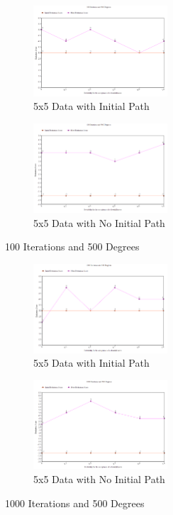 \documentclass[11pt, oneside]{article}   	%
\begin{document}
\begin{figure}[H]
\centering
\begin{subfigure}{.5\textwidth}
	\centering
	\includegraphics[width=50mm]{5x5lowIhighT.png}
	\caption{5x5 Data with Initial Path}
	\label{fig:method}
\end{subfigure}%
\begin{subfigure}{.5\textwidth}
	\centering
	\includegraphics[width=50mm]{5x5lowIhighTPath.png}
	\caption{5x5 Data with No Initial Path}
	\label{fig:method}
\end{subfigure}
\caption{100 Iterations and 500 Degrees}
\end{figure}

\begin{figure}[H]
\centering
\begin{subfigure}{.5\textwidth}
	\centering
	\includegraphics[width=50mm]{5x5highIhighT.png}
	\caption{5x5 Data with Initial Path}
	\label{fig:method}
\end{subfigure}%
\begin{subfigure}{.5\textwidth}
	\centering
	\includegraphics[width=50mm]{5x5highIhighTPath.png}
	\caption{5x5 Data with No Initial Path}
	\label{fig:method}
\end{subfigure}
\caption{1000 Iterations and 500 Degrees}
\end{figure}
\end{document}
